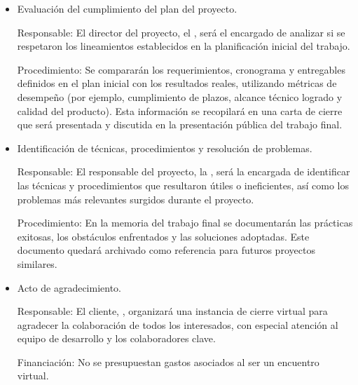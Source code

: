 \documentclass[
11pt, %
]{charter}
\begin{document}
\begin{itemize}
\item Evaluación del cumplimiento del plan del proyecto.

Responsable: El director del proyecto, el {\supname}, será el encargado de analizar si se respetaron los lineamientos establecidos en la planificación inicial del trabajo.

Procedimiento: Se compararán los requerimientos, cronograma y entregables definidos en el plan inicial con los resultados reales, utilizando métricas de desempeño (por ejemplo, cumplimiento de plazos, alcance técnico logrado y calidad del producto). Esta información se recopilará en una carta de cierre que será presentada y discutida en la presentación pública del trabajo final. 

\item Identificación de técnicas, procedimientos y resolución de problemas.

Responsable: El responsable del proyecto, la {\authorname}, será la encargada de identificar las técnicas y procedimientos que resultaron útiles o ineficientes, así como los problemas más relevantes surgidos durante el proyecto.

Procedimiento: En la memoria del trabajo final se documentarán las prácticas exitosas, los obstáculos enfrentados y las soluciones adoptadas. Este documento quedará archivado como referencia para futuros proyectos similares.

\item Acto de agradecimiento.

Responsable: El cliente, {\clientename}, organizará una instancia de cierre virtual para agradecer la colaboración de todos los interesados, con especial atención al equipo de desarrollo y los colaboradores clave.

Financiación: No se presupuestan gastos asociados al ser un encuentro virtual.
\end{itemize}
\end{document}
